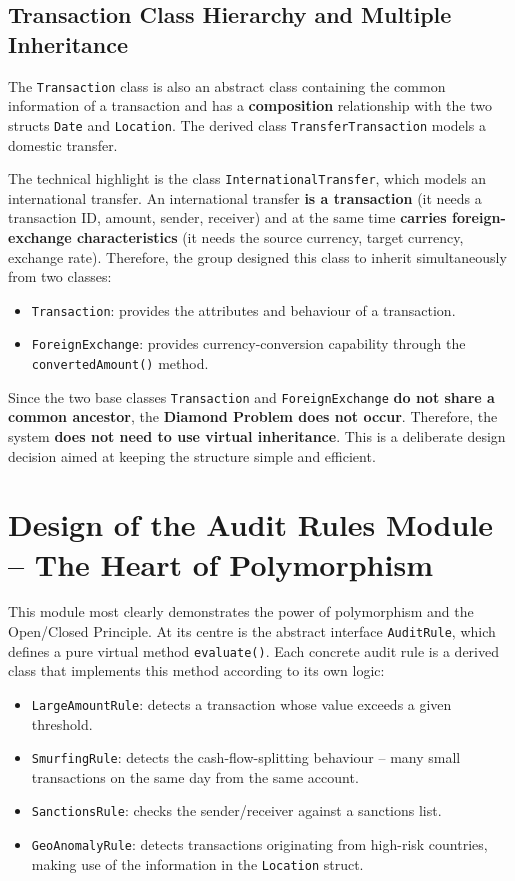     \subsection{Transaction Class Hierarchy and Multiple Inheritance}
    \label{sec:multiple_inheritance}
    The \texttt{Transaction} class is also an abstract class containing the common information of a transaction and has a \textbf{composition} relationship with the two structs \texttt{Date} and \texttt{Location}. The derived class \texttt{TransferTransaction} models a domestic transfer.

    The technical highlight is the class \texttt{InternationalTransfer}, which models an international transfer. An international transfer \textbf{is a transaction} (it needs a transaction ID, amount, sender, receiver) and at the same time \textbf{carries foreign-exchange characteristics} (it needs the source currency, target currency, exchange rate). Therefore, the group designed this class to inherit simultaneously from two classes:
    \begin{itemize}
        \item \texttt{Transaction}: provides the attributes and behaviour of a transaction.
        \item \texttt{ForeignExchange}: provides currency-conversion capability through the \texttt{convertedAmount()} method.
    \end{itemize}

    \begin{nx}
    Since the two base classes \texttt{Transaction} and \texttt{ForeignExchange} \textbf{do not share a common ancestor}, the \textbf{Diamond Problem does not occur}. Therefore, the system \textbf{does not need to use virtual inheritance}. This is a deliberate design decision aimed at keeping the structure simple and efficient.
    \end{nx}

\section{Design of the Audit Rules Module -- The Heart of Polymorphism}
    This module most clearly demonstrates the power of polymorphism and the Open/Closed Principle. At its centre is the abstract interface \texttt{AuditRule}, which defines a pure virtual method \texttt{evaluate()}. Each concrete audit rule is a derived class that implements this method according to its own logic:
    \begin{itemize}
        \item \texttt{LargeAmountRule}: detects a transaction whose value exceeds a given threshold.
        \item \texttt{SmurfingRule}: detects the cash-flow-splitting behaviour -- many small transactions on the same day from the same account.
        \item \texttt{SanctionsRule}: checks the sender/receiver against a sanctions list.
        \item \texttt{GeoAnomalyRule}: detects transactions originating from high-risk countries, making use of the information in the \texttt{Location} struct.
    \end{itemize}


